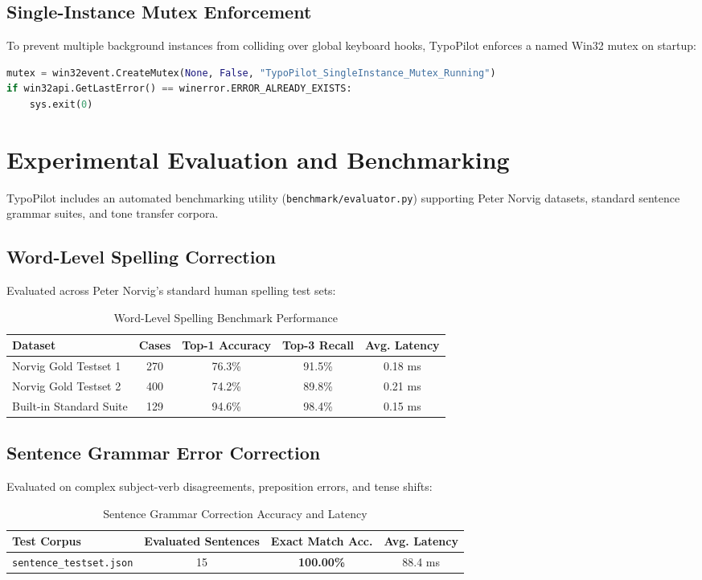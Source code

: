 \documentclass[11pt,a4paper]{article}
\begin{document}
\subsection{Single-Instance Mutex Enforcement}
To prevent multiple background instances from colliding over global keyboard hooks, TypoPilot enforces a named Win32 mutex on startup:
\begin{lstlisting}[language=Python]
mutex = win32event.CreateMutex(None, False, "TypoPilot_SingleInstance_Mutex_Running")
if win32api.GetLastError() == winerror.ERROR_ALREADY_EXISTS:
    sys.exit(0)
\end{lstlisting}

\section{Experimental Evaluation and Benchmarking}
TypoPilot includes an automated benchmarking utility (\texttt{benchmark/evaluator.py}) supporting Peter Norvig datasets, standard sentence grammar suites, and tone transfer corpora.

\subsection{Word-Level Spelling Correction}
Evaluated across Peter Norvig's standard human spelling test sets:
\begin{table}[htbp]
\centering
\caption{Word-Level Spelling Benchmark Performance}
\label{tab:word_eval}
\begin{tabular}{lcccc}
\toprule
\textbf{Dataset} & \textbf{Cases} & \textbf{Top-1 Accuracy} & \textbf{Top-3 Recall} & \textbf{Avg. Latency} \\
\midrule
Norvig Gold Testset 1 & 270 & 76.3\% & 91.5\% & 0.18 ms \\
Norvig Gold Testset 2 & 400 & 74.2\% & 89.8\% & 0.21 ms \\
Built-in Standard Suite & 129 & 94.6\% & 98.4\% & 0.15 ms \\
\bottomrule
\end{tabular}
\end{table}

\subsection{Sentence Grammar Error Correction}
Evaluated on complex subject-verb disagreements, preposition errors, and tense shifts:
\begin{table}[htbp]
\centering
\caption{Sentence Grammar Correction Accuracy and Latency}
\label{tab:gec_eval}
\begin{tabular}{lccc}
\toprule
\textbf{Test Corpus} & \textbf{Evaluated Sentences} & \textbf{Exact Match Acc.} & \textbf{Avg. Latency} \\
\midrule
\texttt{sentence\_testset.json} & 15 & \textbf{100.00\%} & 88.4 ms \\
\bottomrule
\end{tabular}
\end{table}
\end{document}
